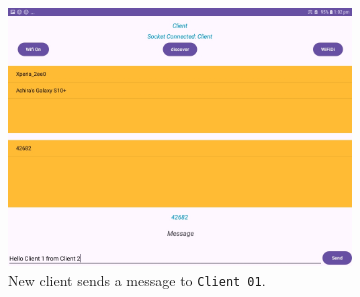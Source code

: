 \begin{figure}
    \centering
    \begin{subfigure}[b]{0.6\textwidth}
        \includegraphics[width=\textwidth,
            height=0.4\textheight]{imgs/client2client-client2.jpg}
        \caption{New client sends a message to \texttt{Client 01}.}
        \label{c2c:1}
    \end{subfigure}
    \hspace{1cm}
    \begin{subfigure}[b]{0.3\textwidth}

\end{subfigure}
\end{figure}
